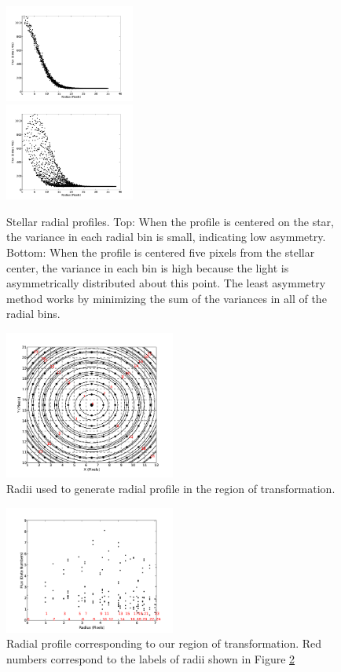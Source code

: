 \documentclass{article}
\begin{document}
\begin{figure}
\centering
\includegraphics[width=0.38\textwidth]{f3a.png}\\
\includegraphics[width=0.38\textwidth]{f3b.png}
\caption{Stellar radial profiles. Top: When the profile is centered on
  the star, the variance in each radial bin is small, indicating low
  asymmetry. Bottom: When the profile is centered five pixels from
  the stellar center, the variance in each bin is high because the
  light is asymmetrically distributed about this point. The least
  asymmetry method works by minimizing the sum of the variances in all of
  the radial bins.}
\label{fig:profs}
\end{figure}

\begin{figure}
\centering
\includegraphics[width=0.5\textwidth]{f4.png}
\caption{Radii used to generate radial profile in the region of
  transformation.}
\label{fig:circles}
\end{figure}

\begin{figure}
\centering
\includegraphics[width=0.5\textwidth]{f5.png}
\caption{Radial profile corresponding to our region of
  transformation. Red numbers correspond to the labels of radii shown
  in Figure \ref{fig:circles}}
\label{fig:circlerad}
\end{figure}
\end{document}
